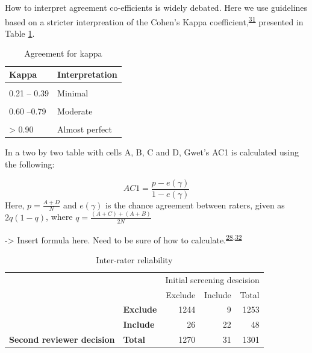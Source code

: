 \documentclass[a4paper, twoside]{templates/ociamthesis}
\begin{document}
How to interpret agreement co-efficients is widely debated. Here we use guidelines based on a stricter interpreation of the Cohen's Kappa coefficient,\textsuperscript{\protect\hyperlink{ref-mchugh2012}{31}} presented in Table \ref{tab:gwet-table}.

\begin{table}[!h]

\caption{\label{tab:gwet-table}Agreement for kappa}
\centering
\begin{tabular}[t]{ll}
\toprule
Kappa & Interpretation\\
\midrule
\cellcolor{gray!6}{0 – 0.20} & \cellcolor{gray!6}{None}\\
0.21 – 0.39 & Minimal\\
\cellcolor{gray!6}{0.40 –.59} & \cellcolor{gray!6}{Weak}\\
0.60 –0.79 & Moderate\\
\cellcolor{gray!6}{0.80–0.90} & \cellcolor{gray!6}{Strong}\\
\addlinespace
> 0.90 & Almost perfect\\
\bottomrule
\end{tabular}
\end{table}

In a two by two table with cells A, B, C and D, Gwet's AC1 is calculated using the following:

\[AC1 = \frac{p-e(\gamma)}{1-e(\gamma)}\]
Here, \(p = \frac{A+D}{N}\) and \(e(\gamma)\) is the chance agreement between raters, given as \(2q(1-q)\), where \(q = \frac{(A+C)+(A+B)}{2N}\)

-\textgreater{} Insert formula here. Need to be sure of how to calculate.\textsuperscript{\protect\hyperlink{ref-gwet2008}{28},\protect\hyperlink{ref-sim2005}{32}}

\begin{table}

\caption{\label{tab:agreementtableinter}Inter-rater reliability}
\centering
\begin{tabular}[t]{>{}l>{}lr>{}r|r}
\toprule
\multicolumn{2}{c}{ } & \multicolumn{3}{c}{Initial screening descision} \\
\cmidrule(l{3pt}r{3pt}){3-5}
 &  & Exclude & Include & Total\\
\midrule
 & \textbf{Exclude} & 1244 & 9 & 1253\\
\cmidrule{2-5}
 & \textbf{Include} & 26 & 22 & 48\\
\cmidrule{2-5}
\multirow{-3}{*}{\raggedright\arraybackslash \textbf{Second reviewer decision}} & \textbf{Total} & 1270 & 31 & 1301\\
\bottomrule
\end{tabular}
\end{table}
\end{document}
